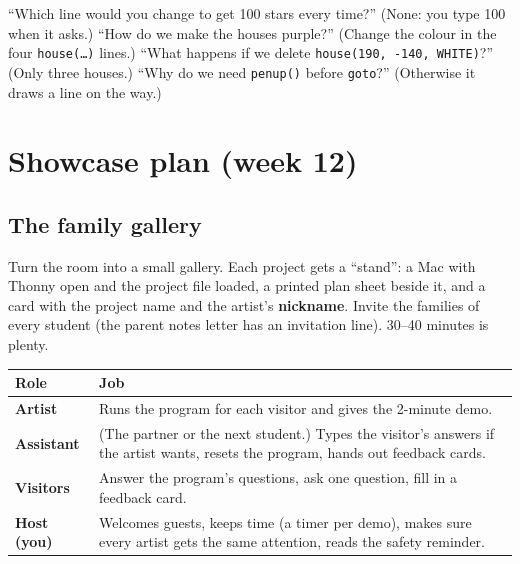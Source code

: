 \documentclass[level=1,teacher]{kidscode}
\begin{document}
\begin{tip}
\enquote{Which line would you change to get 100 stars every time?} (None: you type 100 when it asks.)
\enquote{How do we make the houses purple?} (Change the colour in the four \texttt{house(\dots)} lines.)
\enquote{What happens if we delete \texttt{house(190, -140, WHITE)}?} (Only three houses.)
\enquote{Why do we need \texttt{penup()} before \texttt{goto}?} (Otherwise it draws a line on the way.)
\end{tip}

\section{Showcase plan (week 12)}

\subsection{The family gallery}
Turn the room into a small gallery. Each project gets a \enquote{stand}: a Mac with Thonny open and the
project file loaded, a printed plan sheet beside it, and a card with the project name and the
artist's \textbf{nickname}. Invite the families of every student (the parent notes letter has an
invitation line). 30--40 minutes is plenty.

\begin{center}\small\renewcommand{\arraystretch}{1.3}
\begin{tabularx}{\linewidth}{@{}>{\bfseries}p{2.6cm}X@{}}
\toprule
Role & Job\\
\midrule
Artist & Runs the program for each visitor and gives the 2-minute demo.\\
Assistant & (The partner or the next student.) Types the visitor's answers if the artist wants, resets the program, hands out feedback cards.\\
Visitors & Answer the program's questions, ask one question, fill in a feedback card.\\
Host (you) & Welcomes guests, keeps time (a timer per demo), makes sure every artist gets the same attention, reads the safety reminder.\\
\bottomrule
\end{tabularx}
\end{center}
\end{document}
